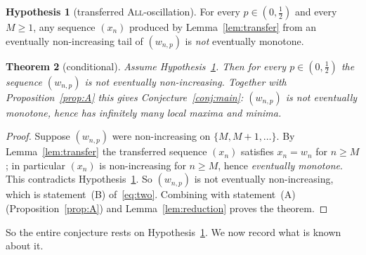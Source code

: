 \documentclass[11pt]{article}
\newtheorem{theorem}{Theorem}[section]
\theoremstyle{definition}
\newtheorem{hypothesis}[theorem]{Hypothesis}
\newcommand{\All}{\textsc{All}}
\begin{document}
\begin{hypothesis}[transferred \All-oscillation]\label{hyp:osc2}
  For every $p\in(0,\tfrac12)$ and every $M\ge 1$, any sequence
  $(x_n)$ produced by Lemma~\ref{lem:transfer} from an eventually
  non-increasing tail of $(w_{n,p})$ is \emph{not} eventually monotone.
\end{hypothesis}

\begin{theorem}[conditional]\label{thm:conditional}
  Assume Hypothesis~\ref{hyp:osc2}. Then for every $p\in(0,\tfrac12)$
  the sequence $(w_{n,p})$ is not eventually non-increasing. Together
  with Proposition~\ref{prop:A} this gives Conjecture~\ref{conj:main}:
  $(w_{n,p})$ is not eventually monotone, hence has infinitely many
  local maxima and minima.
\end{theorem}

\begin{proof}
  Suppose $(w_{n,p})$ were non-increasing on $\{M,M+1,\dots\}$. By
  Lemma~\ref{lem:transfer} the transferred sequence $(x_n)$ satisfies
  $x_n=w_n$ for $n\ge M$; in particular $(x_n)$ is non-increasing for
  $n\ge M$, hence \emph{eventually monotone}. This contradicts
  Hypothesis~\ref{hyp:osc2}. So $(w_{n,p})$ is not eventually
  non-increasing, which is statement~(B) of~\eqref{eq:two}. Combining
  with statement~(A) (Proposition~\ref{prop:A}) and
  Lemma~\ref{lem:reduction} proves the theorem.
\end{proof}

So the entire conjecture rests on Hypothesis~\ref{hyp:osc2}. We now
record what is known about it.
\end{document}
